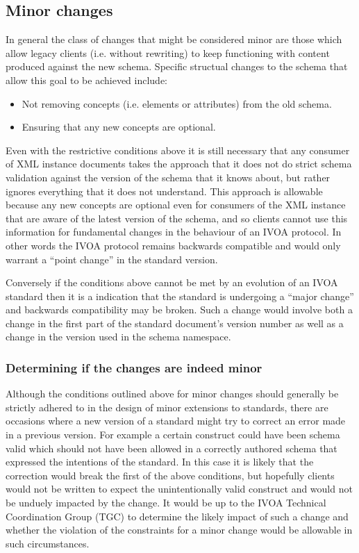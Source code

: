 \documentclass[10pt,a4paper]{ivoa}
\begin{document}
\subsection{Minor changes}
In general the class of changes that might be considered minor are those
which allow legacy clients (i.e. without rewriting) to keep functioning with
content produced against the new schema.
Specific structual changes to the schema that allow this goal to be achieved
include:

\begin{itemize}
  \item Not removing concepts (i.e. elements or attributes) from the old
  schema.
  \item Ensuring that any new concepts are optional.
\end{itemize}
Even with the restrictive conditions above it is still necessary that any
consumer of XML instance documents takes the approach that it does not do strict
schema validation against the version of the schema that it knows about, but
rather ignores everything that it does not understand. This approach is allowable
because any new concepts are optional even for consumers of the XML instance
that are aware of the latest version of the schema, and so clients cannot use
this information for fundamental changes in the behaviour of an IVOA protocol.
In other words the IVOA protocol remains backwards compatible and would only
warrant a ``point change'' in the standard version.

Conversely if the conditions above cannot be met by an evolution of an IVOA
standard then it is a indication that the standard is undergoing a ``major
change'' and backwards compatibility may be broken. Such a change would
involve both a change in the first part of the standard document's version
 number as well as a change in the version used in the schema
namespace.
\subsubsection{Determining if the changes are indeed minor}
Although the conditions outlined above for minor changes should generally be
strictly adhered to in the design of minor extensions to standards, there are
occasions where a new version of a standard might try to correct an error made
in a previous version. For example a certain construct could have been
schema valid which should not have been allowed in a correctly authored
schema that expressed the intentions of the standard. In this case it is likely
that the correction would break the first of the above conditions, but hopefully
clients would not be written to expect the unintentionally valid construct and
would not be unduely impacted by the change. It would be up to the IVOA
Technical Coordination Group (TGC) to determine the likely impact of such a
change and whether the violation of the constraints for a minor change would be
allowable in such circumstances.
\end{document}
